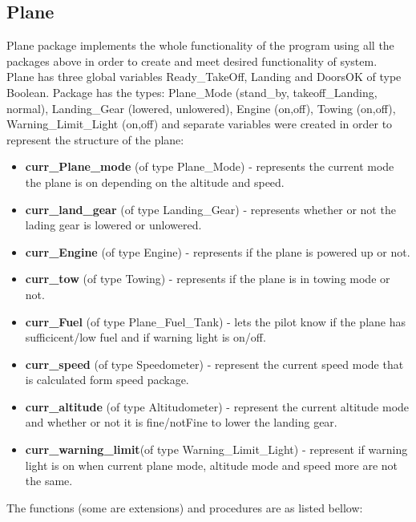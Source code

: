 \documentclass{llncs}
\begin{document}
\subsection{Plane}
Plane package implements the whole functionality of the program using all the packages above in order to create and meet desired functionality of system. \\Plane has three global variables Ready\_TakeOff, Landing and DoorsOK of type Boolean. Package  has the types: Plane\_Mode (stand\_by, takeoff\_Landing, normal), Landing\_Gear (lowered, unlowered), Engine (on,off), Towing (on,off), Warning\_Limit\_Light (on,off) and separate variables were created in order to represent the structure of the plane:
\begin{itemize}
\item \textbf{curr\_Plane\_mode} (of type Plane\_Mode) - represents the current mode the plane is on depending on the altitude and speed.
\item \textbf{curr\_land\_gear} (of type Landing\_Gear) - represents whether or not the lading gear is lowered or unlowered. 
\item \textbf{curr\_Engine} (of type Engine) - represents if the plane is powered up or not.
\item \textbf{curr\_tow} (of type Towing) - represents if the plane is in towing mode or not. 
\item \textbf{curr\_Fuel} (of type Plane\_Fuel\_Tank) -  lets the pilot know if the plane has sufficicent/low fuel and if warning light is on/off.
\item \textbf{curr\_speed} (of type Speedometer) - represent the current speed mode that is calculated form speed package. 
\item \textbf{curr\_altitude} (of type Altitudometer) - represent the current altitude mode and whether or not it is fine/notFine to lower the landing gear.
\item \textbf{curr\_warning\_limit}(of type Warning\_Limit\_Light) - represent if warning light is on when current plane mode, altitude mode and speed more are not the same. 
\end{itemize}
The functions (some are extensions) and procedures are as listed bellow: 
\end{document}
